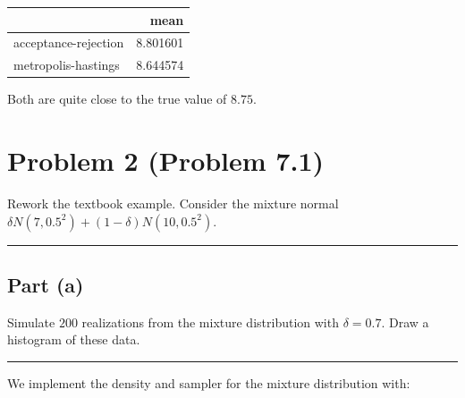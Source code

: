 \documentclass[
  11pt,
]{paper}
\begin{document}
\begin{longtable}[]{@{}lr@{}}
\toprule\noalign{}
& mean \\
\midrule\noalign{}
\endhead
\bottomrule\noalign{}
\endlastfoot
acceptance-rejection & 8.801601 \\
metropolis-hastings & 8.644574 \\
\end{longtable}

Both are quite close to the true value of \(8.75\).

\hypertarget{problem-2-problem-7.1}{%
\section{Problem 2 (Problem 7.1)}\label{problem-2-problem-7.1}}

Rework the textbook example. Consider the mixture normal
\(\delta N(7,0.5^2) + (1-\delta) N(10,0.5^2)\).

\begin{center}\rule{0.5\linewidth}{0.5pt}\end{center}

\hypertarget{part-a-1}{%
\subsection{Part (a)}\label{part-a-1}}

Simulate \(200\) realizations from the mixture distribution with
\(\delta = 0.7\). Draw a histogram of these data.

\begin{center}\rule{0.5\linewidth}{0.5pt}\end{center}

We implement the density and sampler for the mixture distribution with:
\end{document}
